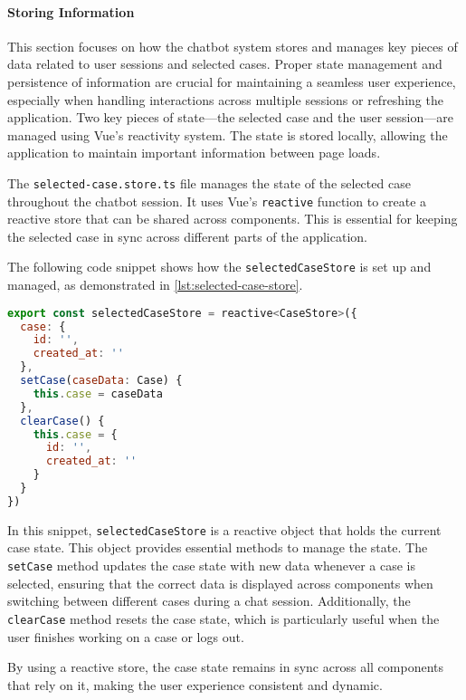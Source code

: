 \paragraph{Storing Information}%

This section focuses on how the chatbot system stores and manages key pieces of data related to user sessions and
selected cases. Proper state management and persistence of information are crucial for maintaining a seamless user
experience, especially when handling interactions across multiple sessions or refreshing the application. Two key pieces
of state—the selected case and the user session—are managed using Vue's reactivity system. The state is stored locally,
allowing the application to maintain important information between page loads.

The \texttt{selected-case.store.ts}
file manages the state of the selected case throughout the chatbot session. It uses Vue's \texttt{reactive}
function to create a reactive store that can be shared across components. This is essential for keeping the selected
case in sync across different parts of the application.

The following code snippet shows how the \texttt{selectedCaseStore} is set up and managed, as demonstrated in
\ref{lst:selected-case-store}.

\begin{lstlisting}[language=JavaScript, caption={Setting up the Case Store (\texttt{selected-case.store.ts})},
  firstnumber=10,label={lst:selected-case-store}]
export const selectedCaseStore = reactive<CaseStore>({
  case: {
    id: '',
    created_at: ''
  },
  setCase(caseData: Case) {
    this.case = caseData
  },
  clearCase() {
    this.case = {
      id: '',
      created_at: ''
    }
  }
})
\end{lstlisting}

In this snippet, \texttt{selectedCaseStore}
is a reactive object that holds the current case state. This object provides essential methods to manage the state. The
\texttt{setCase}
method updates the case state with new data whenever a case is selected, ensuring that the correct data is displayed
across components when switching between different cases during a chat session. Additionally, the \texttt{clearCase}
method resets the case state, which is particularly useful when the user finishes working on a case or logs out.

By using a reactive store, the case state remains in sync across all components that rely on it, making the user
experience consistent and dynamic.

